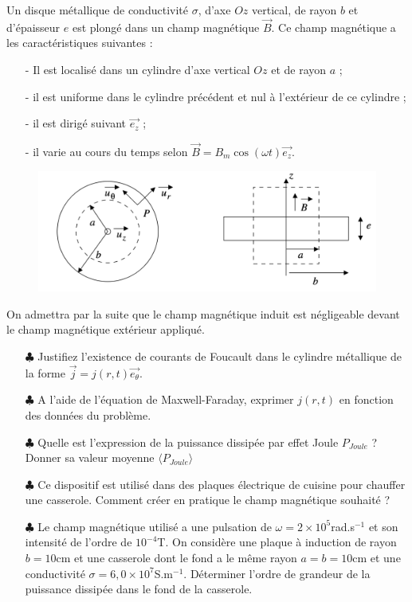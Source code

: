 \documentclass{report}
\begin{document}
Un disque métallique de conductivité $\sigma$, d'axe $Oz$ vertical, de rayon $b$ et d'épaisseur $e$ est plongé dans un champ magnétique $\vec{B}$. Ce champ magnétique a les caractéristiques suivantes :
\begin{itemize}

\item[-] Il est localisé dans un cylindre d'axe vertical $Oz$ et de rayon $a$ ;
\item[-] il est uniforme dans le cylindre précédent et nul à l'extérieur de ce cylindre ;
\item[-] il est dirigé suivant $\vec{e_z}$ ;
\item[-] il varie au cours du temps selon $\vec{B}=B_m\cos(\omega t)\vec{e_z}$.

\end{itemize}

\begin{figure}[h!]
\centering
		\includegraphics[scale=0.25]{induction3.png}
\end{figure}

On admettra par la suite que le champ magnétique induit est négligeable devant le champ magnétique extérieur appliqué. 

\begin{itemize}

	\item[$\clubsuit$] Justifiez l'existence de courants de Foucault dans le cylindre métallique de la forme $\vec{j}=j(r,t)\vec{e_\theta}$.
	
	\item[$\clubsuit$] A l'aide de l'équation de Maxwell-Faraday, exprimer $j(r,t)$ en fonction des données du problème.
	
	\item[$\clubsuit$] Quelle est l'expression de la puissance dissipée par effet Joule $P_{Joule}$ ? Donner sa valeur moyenne $\langle P_{Joule}\rangle$
	
	\item[$\clubsuit$] Ce dispositif est utilisé dans des plaques électrique de cuisine pour chauffer une casserole. Comment créer en pratique le champ magnétique souhaité ?
	
	\item[$\clubsuit$] Le champ magnétique utilisé a une pulsation de $\omega=2\times10^{5}$rad.s$^{-1}$ et son intensité de l'ordre de $10^{-4}$T. On considère une plaque à induction de rayon $b=10$cm et une casserole dont le fond a le même rayon $a=b=10$cm et une conductivité $\sigma=6,0\times10^{7}$S.m$^{-1}$. Déterminer l'ordre de grandeur de la puissance dissipée dans le fond de la casserole. 

\end{itemize}
\end{document}
